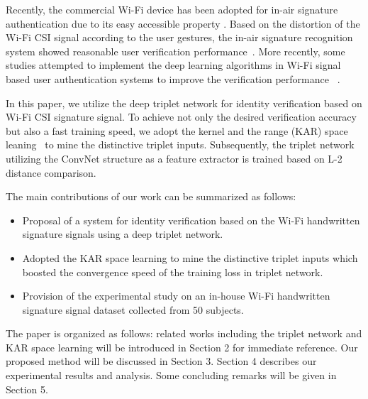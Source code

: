 \documentclass[runningheads]{llncs}
\begin{document}
Recently, the commercial Wi-Fi device has been adopted for in-air signature authentication due to its easy accessible property \cite{moon2017air}. Based on the distortion of the  Wi-Fi CSI signal according to the user gestures, the in-air signature recognition system showed reasonable user verification performance~\cite{moon2017air}. 
More recently, some studies attempted to implement the deep learning algorithms in Wi-Fi signal based user authentication systems to improve the verification performance ~\cite{shi2017smart,pokkunuru2018neuralwave}. 

In this paper, we utilize the deep triplet network for identity verification based on Wi-Fi CSI signature signal. To achieve not only the desired verification accuracy but also a fast training speed, we adopt the kernel and the range (KAR) space leaning~\cite{toh100,toh2018learning,toh2018analytic,toh2018gradient} to mine the distinctive triplet inputs. Subsequently, the triplet network utilizing the ConvNet structure as a feature extractor is trained based on L-2 distance comparison.

The main contributions of our work can be summarized as follows:
\begin{itemize}
\item Proposal of a system for identity verification based on the Wi-Fi handwritten signature signals using a deep triplet network.
\item Adopted the KAR space learning to mine the distinctive triplet inputs which boosted the convergence speed of the training loss in triplet network.
\item Provision of the experimental study on an in-house Wi-Fi handwritten signature signal dataset collected from 50 subjects.
\end{itemize}

The paper is organized as follows: related works including the triplet network and KAR space learning will be introduced in Section 2 for immediate reference. Our proposed method will be discussed in Section 3. Section 4 describes our experimental results and analysis. Some concluding remarks will be given in Section 5.
\end{document}
